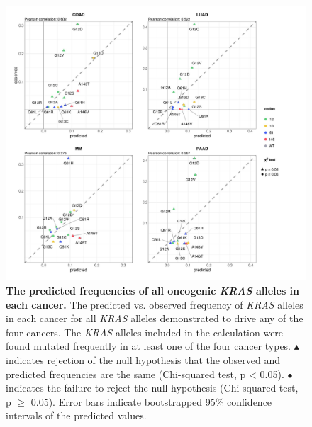 \documentclass[english, 10pt, letterpaper]{article}
\newcommand{\KRAS}{\emph{KRAS}}
\begin{document}
\begin{figure}[h!]
\centering
\includegraphics[width=180mm]{figures/Supp_Fig_2.jpeg}
\caption{
    \textbf{The predicted frequencies of all oncogenic \KRAS{} alleles in each cancer.}
    The predicted vs. observed frequency of \KRAS{} alleles in each cancer for all \KRAS{} alleles demonstrated to drive any of the four cancers. The \KRAS{} alleles included in the calculation were found mutated frequently in at least one of the four cancer types. $\blacktriangle$ indicates rejection of the null hypothesis that the observed and predicted frequencies are the same (Chi-squared test, p < 0.05). $\bullet$ indicates the failure to reject the null hypothesis (Chi-squared test, p $\ge$ 0.05). Error bars indicate bootstrapped 95\% confidence intervals of the predicted values.
}
\label{sfig:obs-vs-pred-supp}
\end{figure}
\newpage
\end{document}
